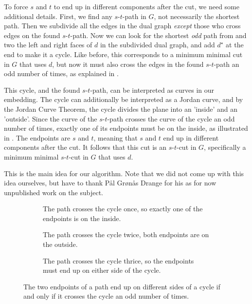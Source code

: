 To force $s$ and $t$ to end up in different components after the cut, we need some additional details. First, we find any $s$-$t$-path in $G$, not necessarily the shortest path. Then we subdivide all the edges in the dual graph \emph{except} those who cross edges on the found $s$-$t$-path. Now we can look for the shortest \emph{odd} path from and two the left and right faces of $d$ in the subdivided dual graph, and add $d^\star$ at the end to make it a cycle. Like before, this corresponds to a minimum minimal cut in $G$ that uses $d$, but now it must also cross the edges in the found $s$-$t$-path an odd number of times, as explained in . 

This cycle, and the found $s$-$t$-path, can be interpreted as curves in our embedding. The cycle can additionally be interpreted as a Jordan curve, and by the Jordan Curve Theorem, the cycle divides the plane into an 'inside' and an 'outside'. Since the curve of the $s$-$t$-path crosses the curve of the cycle an odd number of times, exactly one of its endpoints must be on the inside, as illustrated in . The endpoints are $s$ and $t$, meaning that $s$ and $t$ end up in different components after the cut. It follows that this cut is an $s$-$t$-cut in $G$, specifically a minimum minimal $s$-$t$-cut in $G$ that uses $d$.

This is the main idea for our algorithm. Note that we did not come up with this idea ourselves, but have to thank Pål Grønås Drange \cite{source:pål} for his as for now unpublished work on the subject.

\begin{figure}[H]
    \centering
    \begin{subfigure}{.30\textwidth}
        \centering
        
        \caption{The path crosses the cycle once, so exactly one of the endpoints is on the inside.}
    \end{subfigure}\hfill%
    \begin{subfigure}{.30\textwidth}
        \centering
        
        \caption{The path crosses the cycle twice, both endpoints are on the outside.}
    \end{subfigure}\hfill%
    \begin{subfigure}{.30\textwidth}
        \centering
        
        \caption{The path crosses the cycle thrice, so the endpoints must end up on either side of the cycle.}
    \end{subfigure}
    \caption{The two endpoints of a path end up on different sides of a cycle if and only if it crosses the cycle an odd number of times.}
    \label{figure:jordan-curve-cuts}
\end{figure}

